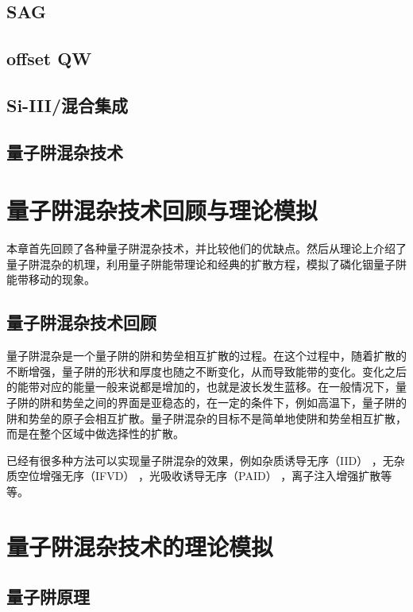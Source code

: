 \documentclass{ZJUthesis}
\begin{document}
\section{SAG}

\section{offset QW}

\section{Si-III/混合集成}

\section{量子阱混杂技术}

\chapter{量子阱混杂技术回顾与理论模拟}

本章首先回顾了各种量子阱混杂技术，并比较他们的优缺点。然后从理论上介绍了量子阱混杂的机理，利用量子阱能带理论和经典的扩散方程，模拟了磷化铟量子阱能带移动的现象。

\section{量子阱混杂技术回顾}

量子阱混杂是一个量子阱的阱和势垒相互扩散的过程。在这个过程中，随着扩散的不断增强，量子阱的形状和厚度也随之不断变化，从而导致能带的变化。变化之后的能带对应的能量一般来说都是增加的，也就是波长发生蓝移。在一般情况下，量子阱的阱和势垒之间的界面是亚稳态的，在一定的条件下，例如高温下，量子阱的阱和势垒的原子会相互扩散。量子阱混杂的目标不是简单地使阱和势垒相互扩散，而是在整个区域中做选择性的扩散。

已经有很多种方法可以实现量子阱混杂的效果，例如杂质诱导无序（IID） \cite{holonyak1998impurity-IID} ，无杂质空位增强无序（IFVD） \cite{si1998area-IFVD}，光吸收诱导无序（PAID） \cite{mckee1997monolithic-PAID}，离子注入增强扩散\cite{charbonneau1998photonic-implantation}等等。

\chapter{量子阱混杂技术的理论模拟}

\section{量子阱原理}
\end{document}
